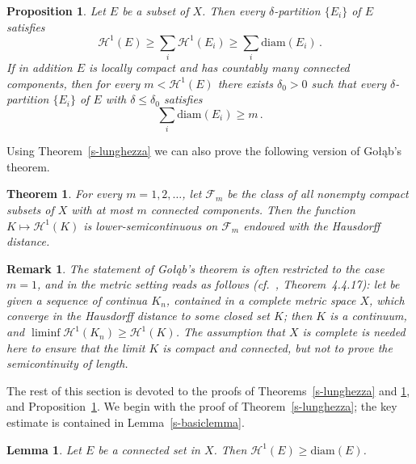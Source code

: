 \documentclass[11pt,reqno,a4paper,final]{amsart}
\numberwithin{equation}{section}
\theoremstyle{mytheorem}
\newtheorem{theorem}[subsection]{Theorem}
\newtheorem{lemma}[subsection]{Lemma}
\newtheorem{proposition}[subsection]{Proposition}
\theoremstyle{myremark}
\newtheorem{remark}[subsection]{Remark}
\theoremstyle{myparagraph}
\newcommand{\F}{\mathscr{F}}
\newcommand{\Haus}{\mathscr{H}}
\newcommand{\Golab}{Go{\l}\k{a}b}
\newcommand{\diam}{\mathrm{diam}}
\begin{document}
\begin{proposition}
\label{s-lunghezza2}
Let $E$ be a subset of $X$. Then every $\delta$-partition $\{E_i\}$ of $E$ satisfies
%
\begin{equation}
\label{e-lunghezza2a}
\Haus^1(E) 
\ge \sum_i \Haus^1(E_i)
\ge \sum_i \diam(E_i)
\, .
\end{equation}
%
If in addition $E$ is locally compact and has countably 
many connected components, then for every $m<\Haus^1(E)$ 
there exists $\delta_0>0$ such that every $\delta$-partition
$\{E_i\}$ of $E$ with $\delta\le\delta_0$ satisfies
%
\begin{equation}
\label{e-lunghezza2b}
\sum_i \diam(E_i) \ge m
\, .
\end{equation}
%
\end{proposition}


Using Theorem~\ref{s-lunghezza} we can also prove the following 
version of \Golab's theorem.

\begin{theorem}
\label{s-golab}
For every $m=1,2,\dots$, let $\F_m$ be the class of all nonempty
compact subsets of $X$ with at most $m$ connected components. 
Then the function $K\mapsto \Haus^1(K)$ is lower-semicontinuous 
on $\F_m$ endowed with the Hausdorff distance.
\end{theorem}


\begin{remark}
\label{s-remgolab}
The statement of \Golab's theorem is often restricted to the case $m=1$, 
and in the metric setting reads as follows
(cf.~\cite{AT}, Theorem~4.4.17): let be given a sequence 
of continua $K_n$, contained in a \emph{complete} 
metric space $X$, which converge in the Hausdorff distance to 
some closed set $K$; then $K$ is a continuum, and 
$\liminf\Haus^1(K_n) \ge \Haus^1(K)$.
The assumption that $X$ is complete is needed here to ensure 
that the limit $K$ is compact and connected, 
but not to prove the semicontinuity of length.
\end{remark}

\bigskip
The rest of this section is devoted to the proofs
of Theorems~\ref{s-lunghezza} and \ref{s-golab}, 
and Proposition~\ref{s-lunghezza2}.
We begin with the proof of Theorem~\ref{s-lunghezza}; 
the key estimate is contained in Lemma~\ref{s-basiclemma}.

\begin{lemma}
\label{s-diam}
Let $E$ be a connected set in $X$.
Then $\Haus^1(E) \ge \diam(E)$. 
\end{lemma}
\end{document}
